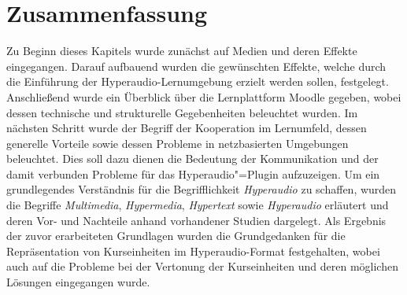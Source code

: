 \section{Zusammenfassung}
Zu Beginn dieses Kapitels wurde zunächst auf Medien und deren Effekte eingegangen. Darauf aufbauend wurden die gewünschten Effekte, welche durch die Einführung der Hyperaudio-Lernumgebung erzielt werden sollen, festgelegt. Anschließend wurde ein Überblick über die Lernplattform Moodle gegeben, wobei dessen technische und strukturelle Gegebenheiten beleuchtet wurden. Im nächsten Schritt wurde der Begriff der Kooperation im Lernumfeld, dessen generelle Vorteile sowie dessen Probleme in netzbasierten Umgebungen beleuchtet.  Dies soll dazu dienen die Bedeutung der Kommunikation und der damit verbunden Probleme für das Hyperaudio"=Plugin aufzuzeigen. Um ein grundlegendes Verständnis für die Begrifflichkeit \textit{Hyperaudio} zu schaffen, wurden die Begriffe \textit{Multimedia}, \textit{Hypermedia}, \textit{Hypertext} sowie \textit{Hyperaudio} erläutert und deren Vor- und Nachteile anhand vorhandener Studien dargelegt. Als Ergebnis der zuvor erarbeiteten Grundlagen wurden die Grundgedanken für die Repräsentation von Kurseinheiten im Hyperaudio-Format festgehalten, wobei auch auf die Probleme bei der Vertonung der Kurseinheiten und deren möglichen Lösungen eingegangen wurde.
